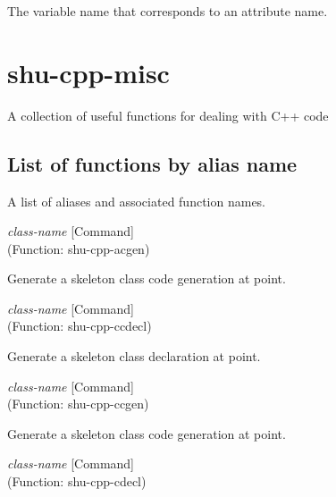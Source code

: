 \begin{doc-string}
The variable name that corresponds to an attribute name.
\end{doc-string}

\eject
\section{shu-cpp-misc}


A collection of useful functions for dealing with C++ code


\subsection{List of functions by alias name}

A list of aliases and associated function names.



\vspace{1em}
\noindent
{}
\usebox{\funcname}\emph{class-name}
 \hfill [Command]\\%
 (Function: shu-cpp-acgen)

\begin{doc-string}
Generate a skeleton class code generation at point.
\end{doc-string}

\vspace{1em}
\noindent
{}
\usebox{\funcname}\emph{class-name}
 \hfill [Command]\\%
 (Function: shu-cpp-ccdecl)

\begin{doc-string}
Generate a skeleton class declaration at point.
\end{doc-string}

\vspace{1em}
\noindent
{}
\usebox{\funcname}\emph{class-name}
 \hfill [Command]\\%
 (Function: shu-cpp-ccgen)

\begin{doc-string}
Generate a skeleton class code generation at point.
\end{doc-string}

\vspace{1em}
\noindent
{}
\usebox{\funcname}\emph{class-name}
 \hfill [Command]\\%
 (Function: shu-cpp-cdecl)

